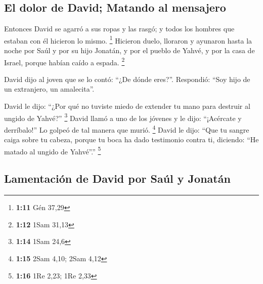 \begin{paracol}{2}
\hypertarget{el-dolor-de-david-matando-al-mensajero}{%
\subsection{El dolor de David; Matando al
mensajero}\label{el-dolor-de-david-matando-al-mensajero}}

 Entonces David se agarró a sus ropas y las rasgó; y
todos los hombres que estaban con él hicieron lo mismo. \footnote{\textbf{1:11}
  Gén 37,29}  Hicieron duelo, lloraron y ayunaron hasta
la noche por Saúl y por su hijo Jonatán, y por el pueblo de Yahvé, y por
la casa de Israel, porque habían caído a espada. \footnote{\textbf{1:12}
  1Sam 31,13}

 David dijo al joven que se lo contó: ``¿De dónde
eres?''. Respondió: ``Soy hijo de un extranjero, un amalecita''.

 David le dijo: ``¿Por qué no tuviste miedo de extender
tu mano para destruir al ungido de Yahvé?'' \footnote{\textbf{1:14} 1Sam
  24,6}  David llamó a uno de los jóvenes y le dijo:
``¡Acércate y derríbalo!'' Lo golpeó de tal manera que murió.
\footnote{\textbf{1:15} 2Sam 4,10; 2Sam 4,12}  David le
dijo: ``Que tu sangre caiga sobre tu cabeza, porque tu boca ha dado
testimonio contra ti, diciendo: ``He matado al ungido de Yahvé''.''
\footnote{\textbf{1:16} 1Re 2,23; 1Re 2,33}

\hypertarget{lamentaciuxf3n-de-david-por-sauxfal-y-jonatuxe1n}{%
\subsection{Lamentación de David por Saúl y
Jonatán}\label{lamentaciuxf3n-de-david-por-sauxfal-y-jonatuxe1n}}


\end{paracol}
